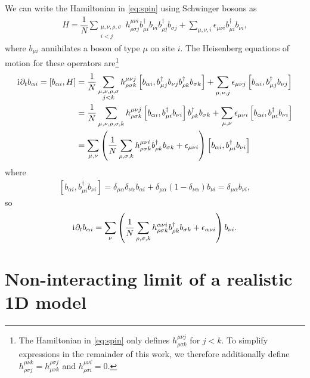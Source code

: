 \documentclass[nofootinbib,notitlepage,11pt]{revtex4-2}
\newcommand{\f}[2]{\dfrac{#1}{#2}} %
\newcommand{\p}[1]{\left(#1\right)} %
\renewcommand{\sp}[1]{\left[#1\right]} %
\renewcommand{\d}{\partial} %
\renewcommand{\i}{\mathrm{i}\mkern1mu} %
\newcommand{\1}{\mathds{1}}
\begin{document}
We can write the Hamiltonian in \eqref{eq:spin} using Schwinger bosons
as
\begin{align}
  H = \f1N \sum_{\substack{\mu,\nu,\rho,\sigma\\i<j}}
  h^{\mu\nu i}_{\rho\sigma j}
  b_{\mu i}^\dag b_{\nu i} b_{\rho j}^\dag b_{\sigma j}
  + \sum_{\mu,\nu,i} \epsilon_{\mu\nu i} b_{\mu i}^\dag b_{\nu i},
\end{align}
where $b_{\mu i}$ annihilates a boson of type $\mu$ on site $i$.  The
Heisenberg equations of motion for these operators are\footnote{The
  Hamiltonian in \eqref{eq:spin} only defines
  $h^{\mu\nu j}_{\rho\sigma k}$ for $j<k$.  To simplify expressions in
  the remainder of this work, we therefore additionally define
  $h^{\mu\nu k}_{\rho\sigma j}=h^{\rho\sigma j}_{\mu\nu k}$ and
  $h^{\mu\nu i}_{\rho\sigma i}=0$.}
\begin{align}
  \i \d_t b_{\alpha i} = \sp{b_{\alpha i}, H}
  &= \f1N \sum_{\substack{\mu,\nu,\rho,\sigma\\j<k}}
  h^{\mu\nu j}_{\rho\sigma k}
  \sp{b_{\alpha i}, b_{\mu j}^\dag b_{\nu j} b_{\rho k}^\dag b_{\sigma k}}
  + \sum_{\mu,\nu,j} \epsilon_{\mu\nu j}
  \sp{b_{\alpha i}, b_{\mu j}^\dag b_{\nu j}} \\
  &= \f1N \sum_{\mu,\nu,\rho,\sigma,k}
  h^{\mu\nu j}_{\rho\sigma k}
  \sp{b_{\alpha i}, b_{\mu i}^\dag b_{\nu i}} b_{\rho k}^\dag b_{\sigma k}
  + \sum_{\mu,\nu} \epsilon_{\mu\nu i}
  \sp{b_{\alpha i}, b_{\mu i}^\dag b_{\nu i}} \\
  &= \sum_{\mu,\nu} \p{\f1N \sum_{\rho,\sigma,k}
    h^{\mu\nu i}_{\rho\sigma k} b_{\rho k}^\dag b_{\sigma k}
    + \epsilon_{\mu\nu i}}
  \sp{b_{\alpha i}, b_{\mu i}^\dag b_{\nu i}}
\end{align}
where
\begin{align}
  \sp{b_{\alpha i}, b_{\mu i}^\dag b_{\nu i}}
  = \delta_{\mu\alpha} \delta_{\nu\alpha} b_{\alpha i}
  + \delta_{\mu\alpha} \p{1-\delta_{\nu\alpha}} b_{\nu i}
  = \delta_{\mu\alpha} b_{\nu i},
\end{align}
so
\begin{align}
  \i \d_t b_{\alpha i}
  = \sum_\nu \p{\f1N \sum_{\rho,\sigma,k}
    h^{\alpha\nu i}_{\rho\sigma k} b_{\rho k}^\dag b_{\sigma k}
    + \epsilon_{\alpha\nu i}} b_{\nu i}.
\end{align}

\section{Non-interacting limit of a realistic 1D model}
\end{document}
